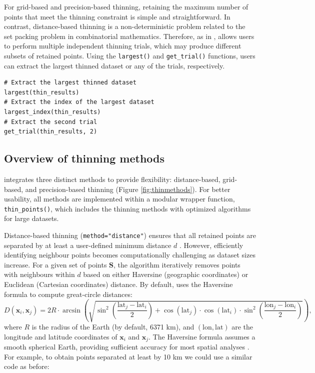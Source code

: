 For grid-based and precision-based thinning, retaining the maximum number of points that meet the thinning constraint is simple and straightforward. In contrast, distance-based thinning is a non-deterministic problem related to the set packing problem in combinatorial mathematics. Therefore, as in ,  allows users to perform multiple independent thinning trials, which may produce different subsets of retained points. Using the \texttt{largest()} and \texttt{get\_trial()} functions, users can extract the largest thinned dataset or any of the trials, respectively.

\begin{verbatim}
# Extract the largest thinned dataset
largest(thin_results)
# Extract the index of the largest dataset
largest_index(thin_results)
# Extract the second trial
get_trial(thin_results, 2)
\end{verbatim}

\subsection{Overview of thinning methods}\label{overview-of-thinning-methods}

 integrates three distinct methods to provide flexibility: distance-based, grid-based, and precision-based thinning (Figure \ref{fig:thinmethods}). For better usability, all methods are implemented within a modular wrapper function, \texttt{thin\_points()}, which includes the thinning methods with optimized algorithms for large datasets.

Distance-based thinning (\texttt{method="distance"}) ensures that all retained points are separated by at least a user-defined minimum distance \(d\) \citep{aiello2015spthin}. However, efficiently identifying neighbour points becomes computationally challenging as dataset sizes increase. For a given set of points \(\mathbf{S}\), the algorithm iteratively removes points with neighbours within \(d\) based on either Haversine (geographic coordinates) or Euclidean (Cartesian coordinates) distance. By default,  uses the Haversine formula \citep{chopde2013landmark} to compute great-circle distances:
\begin{equation}
D(\mathbf{x}_i, \mathbf{x}_j) = 2R \cdot \arcsin \left( \sqrt{\sin^2 \left( \frac{\text{lat}_j - \text{lat}_i}{2} \right) + \cos(\text{lat}_j) \cdot \cos(\text{lat}_i) \cdot \sin^2 \left( \frac{\text{lon}_j - \text{lon}_i}{2} \right)} \right),
  \label{eq:haversine}
\end{equation}
where \(R\) is the radius of the Earth (by default, 6371 km), and \((\text{lon}, \text{lat})\) are the longitude and latitude coordinates of \(\mathbf{x}_i\) and \(\mathbf{x}_j\). The Haversine formula assumes a smooth spherical Earth, providing sufficient accuracy for most spatial analyses \citep{maria2020measure}. For example, to obtain points separated at least by 10 km we could use a similar code as before:


